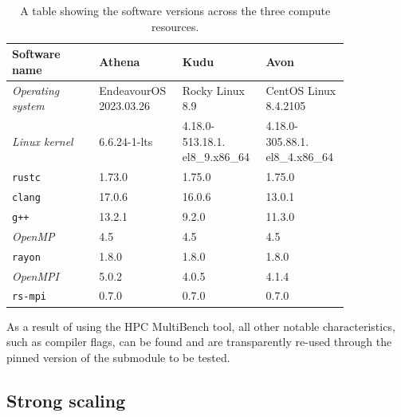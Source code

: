 \begin{table}[H]
    \caption{A table showing the software versions across the three compute resources.}
    \label{table:compute-resource-software-versions}
    \begin{tabular}{|p{0.24\linewidth}||p{0.2\linewidth}|p{0.2\linewidth}|p{0.2\linewidth}|}
    \hline
    \textbf{Software name} & \textbf{Athena} & \textbf{Kudu} & \textbf{Avon} \\
    \hline\hline
    \textit{Operating system} & EndeavourOS 2023.03.26 & Rocky Linux 8.9                & CentOS Linux 8.4.2105          \\\hline
    \textit{Linux kernel}     & 6.6.24-1-lts                     & 4.18.0-513.18.1. el8\_9.x86\_64 & 4.18.0-305.88.1. el8\_4.x86\_64 \\\hline
    \texttt{rustc}            & 1.73.0                           & 1.75.0                         & 1.75.0                         \\\hline
    \texttt{clang}            & 17.0.6                           & 16.0.6                         & 13.0.1                         \\\hline
    \texttt{g++}              & 13.2.1                           & 9.2.0                          & 11.3.0                         \\\hline
    \textit{OpenMP}           & 4.5                              & 4.5                            & 4.5                            \\\hline
    \texttt{rayon}            & 1.8.0                            & 1.8.0                          & 1.8.0                          \\\hline
    \textit{OpenMPI}          & 5.0.2                            & 4.0.5                          & 4.1.4                          \\\hline
    \texttt{rs-mpi}           & 0.7.0                            & 0.7.0                          & 0.7.0                          \\\hline
    \end{tabular}
\end{table}

As a result of using the HPC MultiBench tool, all other notable characteristics, such as compiler flags, can be found and are transparently re-used through the pinned version of the submodule to be tested.

\subsection{Strong scaling}
\label{ssec:strong-scaling}


